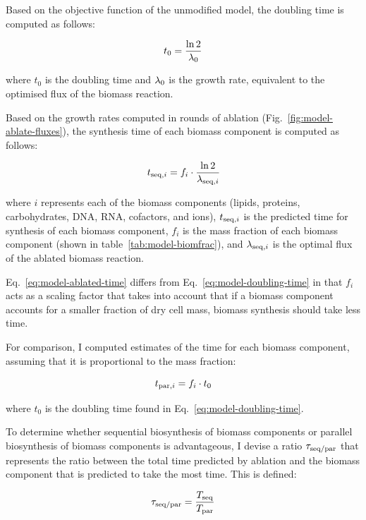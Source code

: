 Based on the objective function of the unmodified model, the doubling time is computed as follows:

\begin{equation}
  t_{0} = \frac{\ln 2}{\lambda_{0}}
  \label{eq:model-doubling-time}
\end{equation}

where $t_{0}$ is the doubling time and $\lambda_{0}$ is the growth rate, equivalent to the optimised flux of the biomass reaction.

Based on the growth rates computed in rounds of ablation (Fig.\ \ref{fig:model-ablate-fluxes}), the synthesis time of each biomass component is computed as follows:

\begin{equation}
  t_{\mathrm{seq},i} = f_{i} \cdot \frac{\ln 2}{\lambda_{\mathrm{seq},i}}
  \label{eq:model-ablated-time}
\end{equation}

where
$i$ represents each of the biomass components (lipids, proteins, carbohydrates, DNA, RNA, cofactors, and ions),
$t_{\mathrm{seq},i}$ is the predicted time for synthesis of each biomass component,
$f_{i}$ is the mass fraction of each biomass component (shown in table~\ref{tab:model-biomfrac}), and
$\lambda_{\mathrm{seq},i}$ is the optimal flux of the ablated biomass reaction.

Eq.\ \ref{eq:model-ablated-time} differs from Eq.\ \ref{eq:model-doubling-time} in that $f_{i}$ acts as a scaling factor that takes into account that if a biomass component accounts for a smaller fraction of dry cell mass, biomass synthesis should take less time.

For comparison, I computed estimates of the time for each biomass component, assuming that it is proportional to the mass fraction:

\begin{equation}
  t_{\mathrm{par},i} = f_{i} \cdot t_{0}
  \label{eq:model-proportional-time}
\end{equation}

where $t_{0}$ is the doubling time found in Eq.\ \ref{eq:model-doubling-time}.

To determine whether sequential biosynthesis of biomass components or parallel biosynthesis of biomass components is advantageous, I devise a ratio $\tau_{\mathrm{seq}/\mathrm{par}}$ that represents the ratio between the total time predicted by ablation and the biomass component that is predicted to take the most time.
This is defined:

\begin{equation}
  \tau_{\mathrm{seq}/\mathrm{par}} = \frac{T_{\mathrm{seq}}}{T_{\mathrm{par}}}
  \label{eq:model-ratio-simplified}
\end{equation}

